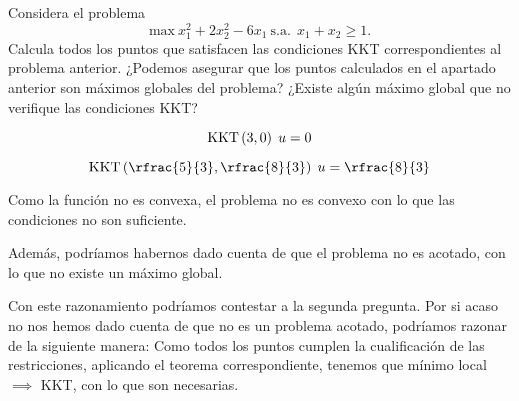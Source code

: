 \begin{problem}[4]

Considera el problema 
\[
\mbox{max}\ x^2_1+2x^2_2-6x_1 \ \mbox{s.a.}\ \ x_1+x_2\geq 1.
\]
\ppart Calcula todos los puntos que satisfacen las condiciones KKT correspondientes al problema anterior.
\ppart ¿Podemos asegurar que los puntos calculados en el apartado anterior son máximos globales del problema? ¿Existe algún máximo global que no verifique las condiciones KKT?

\solution

\spart 

\[\mbox{KKT}\left(3,0\right) \; u=0\]

\[\KKT{\rfrac{5}{3},\rfrac{8}{3}}\; u = \rfrac{8}{3}\]

\spart Como la función no es convexa, el problema no es convexo con lo que las condiciones no son suficiente.

\obs Además, podríamos habernos dado cuenta de que el problema no es acotado, con lo que no existe un máximo global.

Con este razonamiento podríamos contestar a la segunda pregunta.
%
Por si acaso no nos hemos dado cuenta de que no es un problema acotado, podríamos razonar de la siguiente manera:
%
Como todos los puntos cumplen la cualificación de las restricciones, aplicando el teorema correspondiente, tenemos que mínimo local $\implies$ KKT, con lo que son necesarias.

\end{problem}

